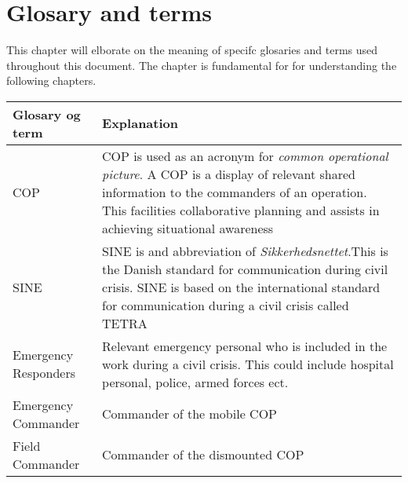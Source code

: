 \label{chp_revisionHistory}
\chapter{Glosary and terms}

This chapter will elborate on the meaning of specifc glosaries and terms used throughout this document. The chapter is fundamental for for understanding the following chapters.

\begin{longtable}{| p{3.5cm} |  p{10cm} | }
	\hline
	\textbf{Glosary og term} &  \textbf{Explanation } \\
	\hline
	COP & COP is used as an acronym for \emph{common operational picture}. A COP is a display of relevant shared information to the commanders of an operation. This facilities collaborative planning and assists in achieving situational awareness \\
	\hline
	SINE & SINE is and abbreviation of \emph{Sikkerhedsnettet}.This is the Danish standard for communication during civil crisis. SINE is based on the international standard for communication during a civil crisis called TETRA\\
	\hline
	Emergency Responders & Relevant emergency personal who is included in the work during a civil crisis. This could include hospital personal, police, armed forces ect.  \\
	\hline
	Emergency Commander & Commander of the mobile COP \\
	\hline
	Field Commander & Commander of the dismounted COP \\
	\hline
\end{longtable}